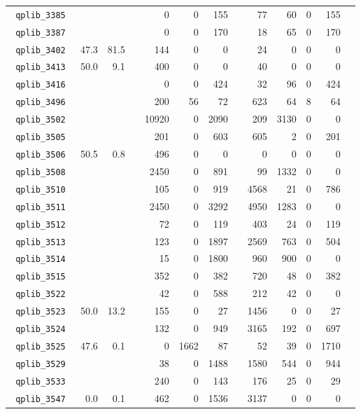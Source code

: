 {\begin{longtable}{lrrrrrrrrrrrr}
\texttt{ 	qplib\_3385	}	&		&		&	&	0	&	0	&	155	&	&	77	&	60	&	0	&	155	\\
\texttt{ 	qplib\_3387	}	&		&		&	&	0	&	0	&	170	&	&	18	&	65	&	0	&	170	\\
\texttt{ 	qplib\_3402	}	&	47.3	&	81.5	&	&	144	&	0	&	0	&	&	24	&	0	&	0	&	0	\\
\texttt{ 	qplib\_3413	}	&	50.0	&	9.1	&	&	400	&	0	&	0	&	&	40	&	0	&	0	&	0	\\
\texttt{ 	qplib\_3416	}	&		&		&	&	0	&	0	&	424	&	&	32	&	96	&	0	&	424	\\
\texttt{ 	qplib\_3496	}	&		&		&	&	200	&	56	&	72	&	&	623	&	64	&	8	&	64	\\
\texttt{ 	qplib\_3502	}	&		&		&	&	10920	&	0	&	2090	&	&	209	&	3130	&	0	&	0	\\
\texttt{ 	qplib\_3505	}	&		&		&	&	201	&	0	&	603	&	&	605	&	2	&	0	&	201	\\
\texttt{ 	qplib\_3506	}	&	50.5	&	0.8	&	&	496	&	0	&	0	&	&	0	&	0	&	0	&	0	\\
\texttt{ 	qplib\_3508	}	&		&		&	&	2450	&	0	&	891	&	&	99	&	1332	&	0	&	0	\\
\texttt{ 	qplib\_3510	}	&		&		&	&	105	&	0	&	919	&	&	4568	&	21	&	0	&	786	\\
\texttt{ 	qplib\_3511	}	&		&		&	&	2450	&	0	&	3292	&	&	4950	&	1283	&	0	&	0	\\
\texttt{ 	qplib\_3512	}	&		&		&	&	72	&	0	&	119	&	&	403	&	24	&	0	&	119	\\
\texttt{ 	qplib\_3513	}	&		&		&	&	123	&	0	&	1897	&	&	2569	&	763	&	0	&	504	\\
\texttt{ 	qplib\_3514	}	&		&		&	&	15	&	0	&	1800	&	&	960	&	900	&	0	&	0	\\
\texttt{ 	qplib\_3515	}	&		&		&	&	352	&	0	&	382	&	&	720	&	48	&	0	&	382	\\
\texttt{ 	qplib\_3522	}	&		&		&	&	42	&	0	&	588	&	&	212	&	42	&	0	&	0	\\
\texttt{ 	qplib\_3523	}	&	50.0	&	13.2	&	&	155	&	0	&	27	&	&	1456	&	0	&	0	&	27	\\
\texttt{ 	qplib\_3524	}	&		&		&	&	132	&	0	&	949	&	&	3165	&	192	&	0	&	697	\\
\texttt{ 	qplib\_3525	}	&	47.6	&	0.1	&	&	0	&	1662	&	87	&	&	52	&	39	&	0	&	1710	\\
\texttt{ 	qplib\_3529	}	&		&		&	&	38	&	0	&	1488	&	&	1580	&	544	&	0	&	944	\\
\texttt{ 	qplib\_3533	}	&		&		&	&	240	&	0	&	143	&	&	176	&	25	&	0	&	29	\\
\texttt{ 	qplib\_3547	}	&	0.0	&	0.1	&	&	462	&	0	&	1536	&	&	3137	&	0	&	0	&	0	\\

\end{longtable}}
